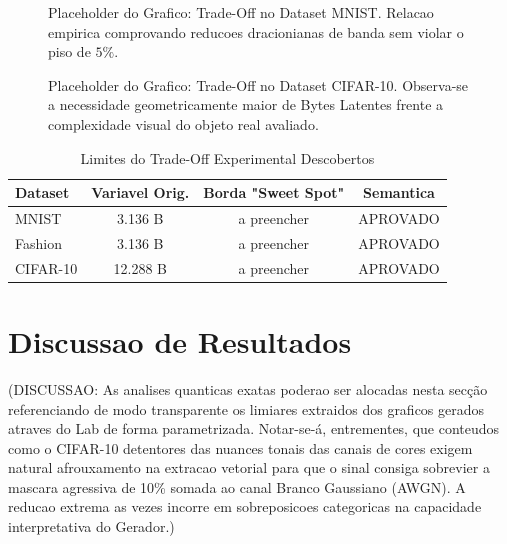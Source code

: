 \documentclass[conference]{IEEEtran}
\begin{document}
\begin{figure}[ht]
\centering
\caption{Placeholder do Grafico: Trade-Off no Dataset MNIST. Relacao empirica comprovando reducoes dracionianas de banda sem violar o piso de $5\%$.}
\label{fig:tradeoff_mnist}
\end{figure}

\begin{figure}[ht]
\centering
\caption{Placeholder do Grafico: Trade-Off no Dataset CIFAR-10. Observa-se a necessidade geometricamente maior de Bytes Latentes frente a complexidade visual do objeto real avaliado.}
\label{fig:tradeoff_cifar10}
\end{figure}

\begin{table}[ht]
\centering
\caption{Limites do Trade-Off Experimental Descobertos}
\label{tab:params}
\begin{tabular}{lccc}
\toprule
\textbf{Dataset} & \textbf{Variavel Orig.} & \textbf{Borda "Sweet Spot"} & \textbf{Semantica} \\
\midrule
MNIST & 3.136 B & a preencher & APROVADO \\
Fashion & 3.136 B & a preencher & APROVADO \\
CIFAR-10 & 12.288 B & a preencher & APROVADO \\
\bottomrule
\end{tabular}
\end{table}


\section{Discussao de Resultados}

(DISCUSSAO: As analises quanticas exatas poderao ser alocadas nesta secção referenciando de modo transparente os limiares extraidos dos graficos gerados atraves do Lab de forma parametrizada. 
Notar-se-á, entrementes, que conteudos como o CIFAR-10 detentores das nuances tonais das canais de cores exigem natural afrouxamento na extracao vetorial para que o sinal consiga sobrevier a mascara agressiva de 10\% somada ao canal Branco Gaussiano (AWGN). A reducao extrema as vezes incorre em sobreposicoes categoricas na capacidade interpretativa do Gerador.)


\end{document}
